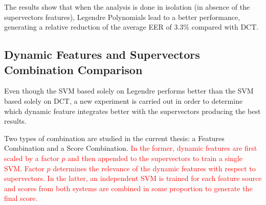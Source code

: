 The results show that when the analysis is done in isolation (in absence of the supervectors
features), Legendre Polynomials lead to a better performance, generating a relative reduction
of the average EER of 3.3\% compared with DCT.

\subsection{Dynamic Features and Supervectors Combination Comparison}

Even though the SVM based solely on Legendre performs better than the SVM based solely on
DCT, a new experiment is carried out in order to determine which
dynamic feature integrates better
with the supervectors producing the best results.

Two types of combination are studied in the current thesis: a Features Combination and a Score
Combination.
\textcolor{red}{
	In the former, dynamic features are first scaled by a factor $p$ and then appended to the
	supervectors to train a single SVM. Factor $p$ determines the relevance of the dynamic features
	with respect to supervectors. In the latter,
	an independent SVM is trained for each feature source and
	scores from both systems are combined in some proportion to generate the final score. }

